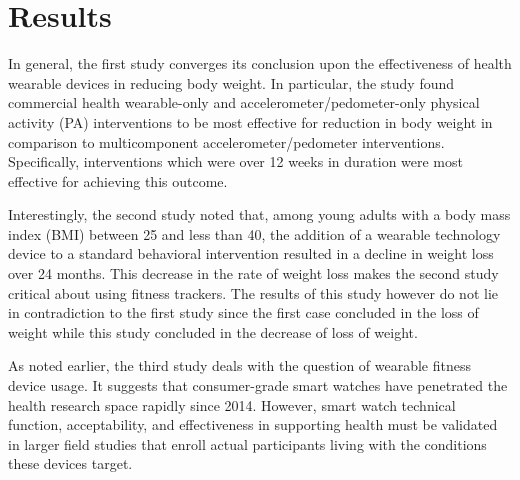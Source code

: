 \section{Results}
In general, the first study converges its conclusion upon the effectiveness of health wearable devices in reducing body weight. In particular, the study found commercial health wearable-only and accelerometer/pedometer-only physical activity (PA) interventions to be most effective for reduction in body weight in comparison to multicomponent accelerometer/pedometer interventions. Specifically, interventions which were over 12 weeks in duration were most effective for achieving this outcome.

Interestingly, the second study noted that, among young adults with a body mass index (BMI) between 25 and less than 40, the addition of a wearable technology device to a standard behavioral intervention resulted in a decline in weight loss over 24 months. This decrease in the rate of weight loss makes the second study critical about using fitness trackers. The results of this study however do not lie in contradiction to the first study since the first case concluded in the loss of weight while this study concluded in the decrease of loss of weight.

As noted earlier, the third study deals with the question of wearable fitness device usage. It suggests that consumer-grade smart watches have penetrated the health research space rapidly since 2014. However, smart watch technical function, acceptability, and effectiveness in supporting health must be validated in larger field studies that enroll actual participants living with the conditions these devices target.